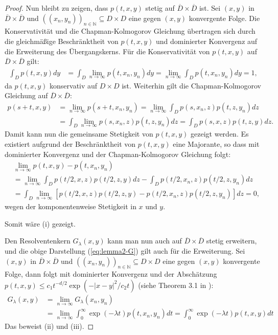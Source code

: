 \documentclass[10pt, a4paper, leqno, twoside, bibliography=totocnumbered, final]{scrartcl}
\theoremstyle{definition}
\theoremstyle{plain}%
\theoremstyle{remark}
\begin{document}
\begin{proof}
Nun bleibt zu zeigen, dass $ p(t,x,y) $ stetig auf $ \overline{D} \times \overline{D} $ ist. Sei $ (x,y) $ in $ \overline{D} \times \overline{D} $ und $ ((x_n, y_n))_{n \in \mathbb{N}} \subseteq D \times D $ eine gegen $ (x,y) $ konvergente Folge. Die Konservativität und die Chapman-Kolmogorov Gleichung übertragen sich durch die gleichmäßige Beschränktheit von $ p(t,x,y) $ und dominierter Konvergenz auf die Erweiterung des Übergangskerns. 
Für die Konservativität von $ p(t,x,y) $ auf $ \overline{D} \times \overline{D} $ gilt:
\begin{align*}
\int_{D} p(t,x,y) dy & = \int_{D} \lim_{n \to \infty} p(t,x_n,y_n) dy  = \lim_{n \to \infty}  \int_{D} p(t,x_n,y_n) dy  = 1,
\end{align*}
da $ p(t,x,y) $ konservativ auf $ D \times D $ ist. Weiterhin gilt die Chapman-Kolmogorov Gleichung auf $ \overline{D} \times \overline{D} $:
\begin{align*}
p(s+t,x,y) & = \lim_{n \to \infty}  p(s+t,x_n,y_n)  = \lim_{n \to \infty}  \int_{D} p(s,x_n,z) p(t,z,y_n) dz \\
& = \int_{D} \lim_{n \to \infty} p(s,x_n,z) p(t,z,y_n) dz  = \int_{D} p(s,x,z) p(t,z,y) dz. 
\end{align*}
Damit kann nun die gemeinsame Stetigkeit von $ p(t,x,y) $ gezeigt werden. Es existiert aufgrund der Beschränktheit von $ p(t,x,y) $ eine Majorante, so dass mit dominierter Konvergenz und der Chapman-Kolmogorov Gleichung folgt:
\begin{align*}
& \lim_{n \to \infty} p(t,x,y) - p(t,x_n,y_n) \\
& = \lim_{n \to \infty} \int_{D} p(t/2,x,z) p(t/2,z,y) dz - \int_{D} p(t/2,x_n,z) p(t/2,z,y_n) dz \\
& = \int_{D} \lim_{n \to \infty} \left[ p(t/2,x,z) p(t/2,z,y) - p(t/2,x_n,z) p(t/2,z,y_n) \right] dz = 0, 
\end{align*}
wegen der komponentenweise Stetigkeit in $x$ und $y$.

Somit wäre (i) gezeigt.
\newline

Den Resolventenkern $ G_{\lambda}(x,y) $ kann man nun auch auf $ \overline{D} \times \overline{D} $ stetig erweitern, und die obige Darstellung (\ref{eq:lemma2-G}) gilt auch für die Erweiterung. Sei $ (x,y) $ in $ \overline{D} \times \overline{D} $ und $ ((x_n, y_n))_{n \in \mathbb{N}} \subseteq D \times D $ eine gegen $ (x,y) $ konvergente Folge, dann folgt mit dominierter Konvergenz und der Abschätzung $ p(t,x,y) \leq c_1 t^{-d/2} \exp(-|x-y|^2 / c_2t) $ (siehe Theorem 3.1 in \cite{Fukushima}): 
\begin{align*}
G_{\lambda}(x,y) & = \lim_{n \to \infty} G_{\lambda}(x_n,y_n) \\
& = \lim_{n \to \infty} \int_0^{\infty} \exp(- \lambda t ) p(t,x_n,y_n) dt = \int_0^{\infty} \exp(- \lambda t ) p(t,x,y) dt
\end{align*}
Das beweist (ii) und (iii).

\end{proof}
\end{document}
